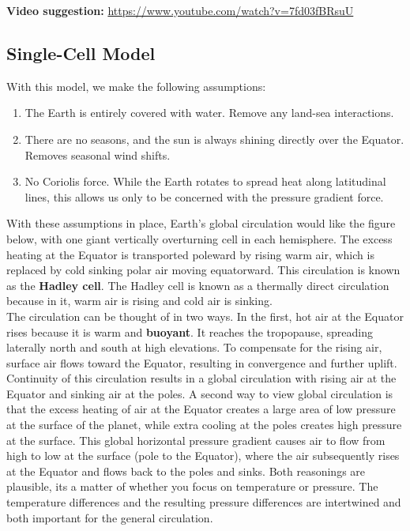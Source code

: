 \documentclass[12pt,oneside]{book}
\providecommand{\tightlist}{%
  \setlength{\itemsep}{0pt}\setlength{\parskip}{0pt}}
\begin{document}
\textbf{Video suggestion:}
\url{https://www.youtube.com/watch?v=7fd03fBRsuU}

\subsection{Single-Cell Model}\label{single-cell-model}

With this model, we make the following assumptions:

\begin{enumerate}
\def\labelenumi{\arabic{enumi}.}
\tightlist
\item
  The Earth is entirely covered with water. Remove any land-sea
  interactions.
\item
  There are no seasons, and the sun is always shining directly over the
  Equator. Removes seasonal wind shifts.
\item
  No Coriolis force. While the Earth rotates to spread heat along
  latitudinal lines, this allows us only to be concerned with the
  pressure gradient force.
\end{enumerate}

With these assumptions in place, Earth's global circulation would like
the figure below, with one giant vertically overturning cell in each
hemisphere. The excess heating at the Equator is transported poleward by
rising warm air, which is replaced by cold sinking polar air moving
equatorward. This circulation is known as the \textbf{Hadley cell}. The
Hadley cell is known as a thermally direct circulation because in it,
warm air is rising and cold air is sinking.\\
The circulation can be thought of in two ways. In the first, hot air at
the Equator rises because it is warm and \textbf{buoyant}. It reaches
the tropopause, spreading laterally north and south at high elevations.
To compensate for the rising air, surface air flows toward the Equator,
resulting in convergence and further uplift. Continuity of this
circulation results in a global circulation with rising air at the
Equator and sinking air at the poles. A second way to view global
circulation is that the excess heating of air at the Equator creates a
large area of low pressure at the surface of the planet, while extra
cooling at the poles creates high pressure at the surface. This global
horizontal pressure gradient causes air to flow from high to low at the
surface (pole to the Equator), where the air subsequently rises at the
Equator and flows back to the poles and sinks. Both reasonings are
plausible, its a matter of whether you focus on temperature or pressure.
The temperature differences and the resulting pressure differences are
intertwined and both important for the general circulation.
\end{document}
